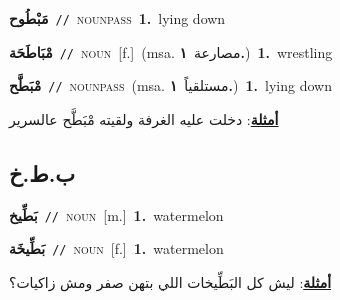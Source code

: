 \documentclass[10pt,a4paper,twoside]{article} %
\begin{document}
\begin{multicols}{2}
{\setlength\topsep{0pt}\textbf{\foreignlanguage{arabic}{مَبْطُوح}}\ {\color{gray}\texttt{//}\color{black}}\ \textsc{noun\textunderscore pass}\ \textbf{1.}~lying down\ } \vspace{2mm}

{\setlength\topsep{0pt}\textbf{\foreignlanguage{arabic}{مْبَاطَحَة}}\ {\color{gray}\texttt{//}\color{black}}\ \textsc{noun}\ [f.]\ \color{gray}(msa. \foreignlanguage{arabic}{مصارعة}~\foreignlanguage{arabic}{\textbf{١.}})\color{black}\ \textbf{1.}~wrestling\ } \vspace{2mm}

{\setlength\topsep{0pt}\textbf{\foreignlanguage{arabic}{مْبَطَّح}}\ {\color{gray}\texttt{//}\color{black}}\ \textsc{noun\textunderscore pass}\ \color{gray}(msa. \foreignlanguage{arabic}{مستلقياً}~\foreignlanguage{arabic}{\textbf{١.}})\color{black}\ \textbf{1.}~lying down\  \begin{flushright}\color{gray}\foreignlanguage{arabic}{\textbf{\underline{\foreignlanguage{arabic}{أمثلة}}}: دخلت عليه الغرفة ولقيته مْبَطَّح عالسرير}\end{flushright}\color{black}} \vspace{2mm}

\vspace{-3mm}
\subsection*{\color{blue}\foreignlanguage{arabic}{ب.ط.خ}\color{blue}{}} 

{\setlength\topsep{0pt}\textbf{\foreignlanguage{arabic}{بَطِّيخ}}\ {\color{gray}\texttt{//}\color{black}}\ \textsc{noun}\ [m.]\ \textbf{1.}~watermelon\ } \vspace{2mm}

{\setlength\topsep{0pt}\textbf{\foreignlanguage{arabic}{بَطِّيخَة}}\ {\color{gray}\texttt{//}\color{black}}\ \textsc{noun}\ [f.]\ \textbf{1.}~watermelon\  \begin{flushright}\color{gray}\foreignlanguage{arabic}{\textbf{\underline{\foreignlanguage{arabic}{أمثلة}}}: ليش كل البَطِّيخات اللي بتهن صفر ومش زاكيات؟}\end{flushright}\color{black}} \vspace{2mm}


\end{multicols}
\end{document}
